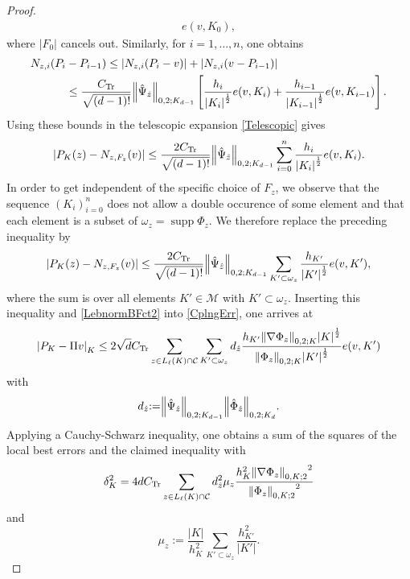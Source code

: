\documentclass[a4paper]{amsart}
\numberwithin{equation}{section}
\theoremstyle{plain}
\theoremstyle{definition}
\begin{document}
\begin{proof}
\begin{align*}
  e(v,{K}_0),
\end{align*}
where ${\left|{{F}_0}\right|}$ cancels out.  Similarly, for $i=1,\dots,n$, one
obtains
\begin{equation*}\begin{aligned}
 {N}_{z,i}(P_i &- P_{i-1})
 \leq
 |{N}_{z,i}(P_i - v)| + |{N}_{z,i}(v - P_{i-1})|
\\
 &\leq
 \frac{{C_\text{Tr}}}{\sqrt{(d-1)!}}
 {{\left\|{{\Hat{\Psi}_{\Hat z}}}\right\|_{{0,2;{{K}_{d-1}}}}}}
 \left[
  \frac{h_{i}}{{\left|{{K}_i}\right|}^{\frac12}} e(v,{K}_i)
  +
  \frac{h_{i-1}}{{\left|{{K}_{i-1}}\right|}^{\frac12}} e(v,{K}_{i-1})
 \right].
\end{aligned}\end{equation*}
Using these bounds in the telescopic expansion \eqref{Telescopic} gives
\[
 |P_{K}(z)-{N}_{z,{F}_z}(v)|
 \leq
 \frac{2{{C_\text{Tr}}}}{\sqrt{(d-1)!}}
 {{\left\|{{\Hat{\Psi}_{\Hat z}}}\right\|_{{0,2;{{K}_{d-1}}}}}}
 \sum_{i=0}^n 
  \frac{h_{i}}{{\left|{{K}_i}\right|}^{\frac12}} e(v,{K}_i).
\]
In order to get independent of the specific choice of ${F}_z$, we
observe that the sequence $({K}_i)_{i=0}^n$ does not allow a double
occurence of some element and that each element is a subset of
$\omega_z=\operatorname{supp}{\Phi}_z$.  We therefore replace the preceding
inequality by
\begin{equation}\label{nbnval}
 |P_{K}(z)-{N}_{z,{F}_z}(v)|
 \leq
 \frac{2{{C_\text{Tr}}}}{\sqrt{(d-1)!}}
 {{\left\|{{\Hat{\Psi}_{\Hat z}}}\right\|_{{0,2;{{K}_{d-1}}}}}}
  \sum_{{K}'\subset\omega_z}
   \frac{h_{{K}'}}{{\left|{{K}'}\right|}^{\frac12}}
   e(v,{K}'),
\end{equation}
where the sum is over all elements ${K}'\in{\mathcal{M}}$ with
${K}'\subset\omega_z$.  Inserting this inequality and
\eqref{LebnormBFct2} into \eqref{CplngErr}, one arrives at
\begin{equation*}
 {\left|{P_{K} - {\Pi} v}\right|_{K}}
 \leq
 2 \sqrt{d} {{C_\text{Tr}}}
 \sum_{z\in{L_{{\ell}}}({K})\cap{\mathcal{C}}}
 \sum_{{K}'\subset\omega_z}
  d_{\Hat z}
   \frac{h_{{K}'} {{\left\|{{{\nabla}{\Phi}_z}}\right\|_{{0,2;{K}}}}} {\left|{K}\right|}^{\frac12}}
   {{{\left\|{{{\Phi}_z}}\right\|_{{0,2;{K}}}}} {\left|{{K}'}\right|}^{\frac12}}
   e(v,{K}')
\end{equation*}
with
\[
 d_{\Hat z}
 {:=}
 {{\left\|{{\Hat{\Psi}_{\Hat z}}}\right\|_{{0,2;{{K}_{d-1}}}}}}
 {{\left\|{{\Hat{\Phi}_{\Hat z}}}\right\|_{{0,2;{{{K}_d}}}}}}.
\]
Applying a Cauchy-Schwarz inequality, one obtains a sum of the squares
of the local best errors and the claimed inequality with
\begin{equation}
\label{locDcplngConst}
 {\delta}_{K}^2
 =
 4 d {{C_\text{Tr}}}
 \sum_{z\in{L_{{\ell}}}({K})\cap{\mathcal{C}}}
  d_{\Hat z}^2 \mu_z
  \frac{h_{K}^2 {{\left\|{{{\nabla}{\Phi}_z}}\right\|_{{0,{K};2}}}}^2}
   {{{\left\|{{{\Phi}_z}}\right\|_{{0,{K};2}}}}^2}
\end{equation}
and
\[
 \mu_z
 {:=}
 \frac{{\left|{K}\right|}}{h_{K}^2}
 \sum_{{K}'\subset\omega_z}
  \frac{h_{{K}'}^2}{{\left|{{K}'}\right|}}.
\] 
\end{proof}
\end{document}
